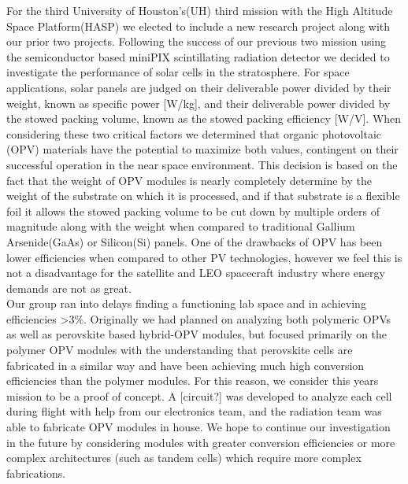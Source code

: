 	For the third University of Houston's(UH) third mission with the High Altitude Space Platform(HASP) we elected to include a new research project along with our prior two projects. Following the success of our previous two mission \cite{SORA 1} \cite{SORA 2} using the semiconductor based miniPIX scintillating radiation detector we decided to investigate the performance of solar cells in the stratosphere. For space applications, solar panels are judged on their deliverable power divided by their weight, known as specific power [W/kg], and their deliverable power divided by the stowed packing volume, known as the stowed packing efficiency [W/V]. When considering these two critical factors we determined that organic photovoltaic (OPV) materials have the potential to maximize both values, contingent on their successful operation in the near space environment.  This decision is based on the fact that the weight of OPV modules is nearly completely determine by the weight of the substrate on which it is processed, and if that substrate is a flexible foil it allows the stowed packing volume to be cut down by multiple orders of magnitude along with the weight when compared to traditional Gallium Arsenide(GaAs) or Silicon(Si) panels. One of the drawbacks of OPV has been lower efficiencies when compared to other PV technologies, however we feel this is not a disadvantage for the satellite and LEO spacecraft industry where energy demands are not as great.\\
	
	 Our group ran into delays finding a functioning lab space and in achieving efficiencies >3\%. Originally we had planned on analyzing both polymeric OPVs as well as perovskite based hybrid-OPV modules, but focused primarily on the polymer OPV modules with the understanding that perovskite cells are fabricated in a similar way and have been achieving much high conversion efficiencies than the polymer modules. For this reason, we consider this years mission to be a proof of concept. A [circuit?] was developed to analyze each cell during flight with help from our electronics team, and the radiation team was able to fabricate OPV modules in house. We hope to continue our investigation in the future by considering modules with greater conversion efficiencies or more complex architectures (such as tandem cells) which require more complex fabrications. 
